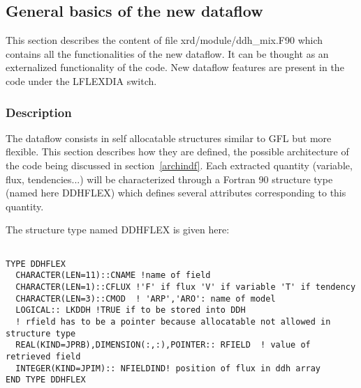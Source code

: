 \subsection{General basics of the new dataflow}
This section describes the content of file xrd/module/ddh\_mix.F90 which contains all the functionalities of the new dataflow.
It can be thought as an externalized functionality of the code. 
New dataflow features are present in the code under the LFLEXDIA switch.

\subsubsection*{Description}
The dataflow consists in self allocatable structures similar to GFL but more flexible. This section describes how they are defined, the possible architecture of the code being discussed in section~\ref{archindf}.
Each extracted quantity (variable, flux, tendencies...) will be characterized through a Fortran 90 structure type (named here DDHFLEX) which defines several attributes corresponding to this quantity.

The structure type named DDHFLEX is given here:
\begin{verbatim}

TYPE DDHFLEX
  CHARACTER(LEN=11)::CNAME !name of field 
  CHARACTER(LEN=1)::CFLUX !'F' if flux 'V' if variable 'T' if tendency
  CHARACTER(LEN=3)::CMOD  ! 'ARP','ARO': name of model
  LOGICAL:: LKDDH !TRUE if to be stored into DDH
  ! rfield has to be a pointer because allocatable not allowed in structure type
  REAL(KIND=JPRB),DIMENSION(:,:),POINTER:: RFIELD  ! value of retrieved field
  INTEGER(KIND=JPIM):: NFIELDIND! position of flux in ddh array 
END TYPE DDHFLEX

\end{verbatim}


